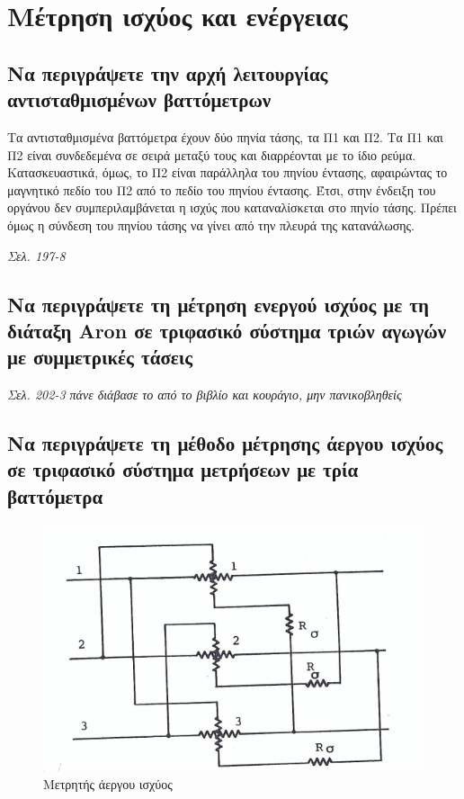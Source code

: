 \documentclass{article}
\begin{document}
\section{Μέτρηση ισχύος και ενέργειας}
\subsection{Να περιγράψετε την αρχή λειτουργίας αντισταθμισμένων βαττόμετρων}
Τα αντισταθμισμένα βαττόμετρα έχουν δύο πηνία τάσης, τα Π1 και Π2. Τα Π1 και Π2 είναι συνδεδεμένα σε σειρά μεταξύ τους και διαρρέονται με το ίδιο ρεύμα. Κατασκευαστικά, όμως, το Π2 είναι παράλληλα του πηνίου έντασης, αφαιρώντας το μαγνητικό πεδίο του Π2 από το πεδίο του πηνίου έντασης. Έτσι, στην ένδειξη του οργάνου δεν συμπεριλαμβάνεται η ισχύς που καταναλίσκεται στο πηνίο τάσης. Πρέπει όμως η σύνδεση του πηνίου τάσης να γίνει από την πλευρά της κατανάλωσης.

\emph{Σελ. 197-8}

\subsection{Να περιγράψετε τη μέτρηση ενεργού ισχύος με τη διάταξη \foreignlanguage{english}{Aron} σε τριφασικό σύστημα τριών αγωγών με συμμετρικές τάσεις}
\emph{Σελ. 202-3 πάνε διάβασε το από το βιβλίο και κουράγιο, μην πανικοβληθείς}

\subsection{Να περιγράψετε τη μέθοδο μέτρησης άεργου ισχύος σε τριφασικό σύστημα μετρήσεων με τρία βαττόμετρα}

\begin{figure}[h!]
    \includegraphics[width=\linewidth]{aei.png}
    \caption{Μετρητής άεργου ισχύος}
    \label{fig:4.3MAI}
\end{figure}
\end{document}
